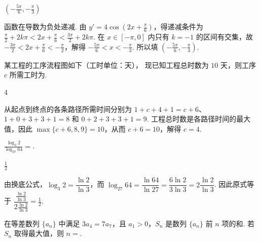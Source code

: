 \documentclass[UTF8,a4paper,oneside,11pt]{ctexbook}
\begin{document}
\begin{answer}
\(\left(-\frac{5\pi}{6},-\frac{\pi}{3}\right)\)
\end{answer}

\begin{solution}
函数在导数为负处递减. 由 \(y'=4\cos\left(2x+\frac{\pi}{6}\right)\)，得递减条件为
\(\frac{\pi}{2}+2k\pi<2x+\frac{\pi}{6}<\frac{3\pi}{2}+2k\pi\). 在 \(x\in[-\pi,0]\) 内只有 \(k=-1\) 的区间有交集，故
\(-\frac{3\pi}{2}<2x+\frac{\pi}{6}< -\frac{\pi}{2}\)，解得 \(-\frac{5\pi}{6}<x< -\frac{\pi}{3}\). 所以填 \(\left(-\frac{5\pi}{6},-\frac{\pi}{3}\right)\).
\end{solution}

\begin{problem}
某工程的工序流程图如下（工时单位：天），
现已知工程总时数为 \(10\text{ 天}\)，则工序 \(c\) 所需工时为\fillinblank{}.

\end{problem}

\begin{answer}
\(4\)
\end{answer}

\begin{solution}
从起点到终点的各条路径所需时间分别为 \(1+c+4+1=c+6\)、\(1+0+3+3+1=8\) 和 \(0+2+3+3+1=9\). 工程总时数是各路径时间的最大值，因此 \(\max\{c+6,8,9\}=10\)，从而 \(c+6=10\)，解得 \(c=4\).
\end{solution}

\begin{problem}
\(\frac{\log_{3}2}{\log_{27}64}= \)\fillinblank{}.
\end{problem}

\begin{answer}
\(\frac{1}{2}\)
\end{answer}

\begin{solution}
由换底公式，\(\log_{3}2=\dfrac{\ln2}{\ln3}\)，而 \(\log_{27}64=\dfrac{\ln64}{\ln27}=\dfrac{6\ln2}{3\ln3}=2\dfrac{\ln2}{\ln3}\). 因此原式等于 \(\dfrac{\frac{\ln2}{\ln3}}{2\frac{\ln2}{\ln3}}=\frac12\).
\end{solution}

\begin{problem}
在等差数列 \(\{a_{n}\} \) 中满足 \(3a_{4}=7a_{7} \)，且 \(a_{1}>0\)，\(S_{n} \) 是数列 \(\{a_{n}\} \) 前 \(n\) 项的和. 若 \(S_{n} \) 取得最大值，则 \(n=\)\fillinblank{}.
\end{problem}
\end{document}
